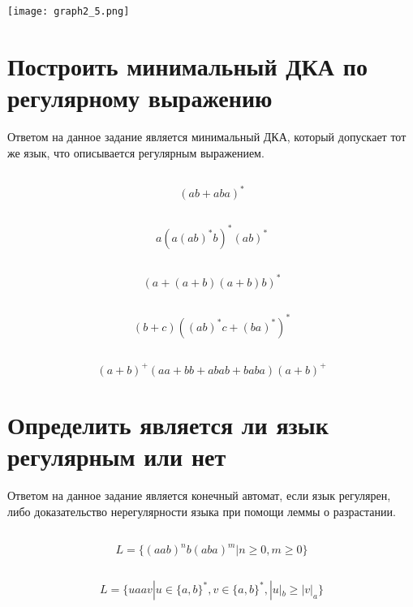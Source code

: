 \documentclass[a4paper, 12pt]{article}
\begin{document}
\begin{center}
    \texttt{[image: graph2\_5.png]}
\end{center}

\newpage
\section{Построить минимальный ДКА по регулярному выражению}
Ответом на данное задание является минимальный ДКА, который допускает тот же язык, что описывается регулярным выражением.

\subsection{}
$$(ab + aba)^*$$

\subsection{}
$$a(a(ab)^*b)^*(ab)^*$$

\subsection{}
$$(a + (a + b)(a + b)b)^*$$

\subsection{}
$$(b + c)((ab)^*c + (ba)^*)^*$$

\subsection{}
$$(a + b)^+(aa + bb + abab + baba)(a + b)^+$$
\newpage

\section{Определить является ли язык регулярным или нет}
Ответом на данное задание является конечный автомат, если язык регулярен, либо доказательство нерегулярности языка при помощи леммы о разрастании.

\subsection{}
$$L = \{(aab)^nb(aba)^m | n \geq 0, m \geq 0\}$$

\subsection{}
$$L = \{uaav | u \in \{a,b\}^*, v \in \{a,b\}^*, |u|_b \geq |v|_a\}$$
\end{document}
